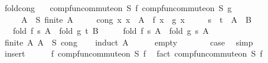 \begin{isabellebody}
\isamarkupfalse%
%
\endisatagproof
{\isafoldproof}%
%
\isadelimproof
\isanewline
%
\endisadelimproof
\isanewline
{}\isamarkupfalse%
\ fold{\isacharunderscore}{\kern0pt}cong{\isacharcolon}{\kern0pt}\isanewline
\ \ \ {\isachardoublequoteopen}comp{\isacharunderscore}{\kern0pt}fun{\isacharunderscore}{\kern0pt}commute{\isacharunderscore}{\kern0pt}on\ S\ f{\isachardoublequoteclose}\ {\isachardoublequoteopen}comp{\isacharunderscore}{\kern0pt}fun{\isacharunderscore}{\kern0pt}commute{\isacharunderscore}{\kern0pt}on\ S\ g{\isachardoublequoteclose}\isanewline
\ \ \ \ \ {\isachardoublequoteopen}A\ {\isasymsubseteq}\ S{\isachardoublequoteclose}\ {\isachardoublequoteopen}finite\ A{\isachardoublequoteclose}\isanewline
\ \ \ \ \ cong{\isacharcolon}{\kern0pt}\ {\isachardoublequoteopen}{\isasymAnd}x{\isachardot}{\kern0pt}\ x\ {\isasymin}\ A\ {\isasymLongrightarrow}\ f\ x\ {\isacharequal}{\kern0pt}\ g\ x{\isachardoublequoteclose}\isanewline
\ \ \ \ \ {\isachardoublequoteopen}s\ {\isacharequal}{\kern0pt}\ t{\isachardoublequoteclose}\ \ {\isachardoublequoteopen}A\ {\isacharequal}{\kern0pt}\ B{\isachardoublequoteclose}\isanewline
\ \ \ {\isachardoublequoteopen}fold\ f\ s\ A\ {\isacharequal}{\kern0pt}\ fold\ g\ t\ B{\isachardoublequoteclose}\isanewline
%
\isadelimproof
%
\endisadelimproof
%
\isatagproof
{}\isamarkupfalse%
\ {\isacharminus}{\kern0pt}\isanewline
\ \ \isamarkupfalse%
\ {\isachardoublequoteopen}fold\ f\ s\ A\ {\isacharequal}{\kern0pt}\ fold\ g\ s\ A{\isachardoublequoteclose}\isanewline
\ \ \ \ \isamarkupfalse%
\ {\isacartoucheopen}finite\ A{\isacartoucheclose}\ {\isacartoucheopen}A\ {\isasymsubseteq}\ S{\isacartoucheclose}\ cong\isanewline
\ \ \isamarkupfalse%
\ {\isacharparenleft}{\kern0pt}induct\ A{\isacharparenright}{\kern0pt}\isanewline
\ \ \ \ \isamarkupfalse%
\ empty\isanewline
\ \ \ \ \isamarkupfalse%
\ \isamarkupfalse%
\ {\isacharquery}{\kern0pt}case\ \isamarkupfalse%
\ simp\isanewline
\ \ \isamarkupfalse%
\isanewline
\ \ \ \ \isamarkupfalse%
\ insert\isanewline
\ \ \ \ \isamarkupfalse%
\ f{\isacharcolon}{\kern0pt}\ comp{\isacharunderscore}{\kern0pt}fun{\isacharunderscore}{\kern0pt}commute{\isacharunderscore}{\kern0pt}on\ S\ f\ \isamarkupfalse%
\ {\isacharparenleft}{\kern0pt}fact\ {\isacartoucheopen}comp{\isacharunderscore}{\kern0pt}fun{\isacharunderscore}{\kern0pt}commute{\isacharunderscore}{\kern0pt}on\ S\ f{\isacartoucheclose}{\isacharparenright}{\kern0pt}\isanewline

\end{isabellebody}
